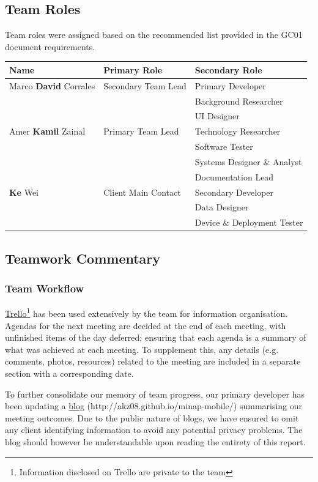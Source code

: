 \documentclass[12pt,a4paper,oneside,titlepage]{article}
\begin{document}
\subsection{Team Roles}
Team roles were assigned based on the recommended list provided in the GC01 document requirements.
\begin{center}
    \begin{tabular}{ | l | l | p{5.4cm} |}
    \hline
    Name & Primary Role & Secondary Role \\ \hline
    Marco \textbf{David} Corrales & Secondary Team Lead & Primary Developer \\&& Background Researcher \\&& UI Designer \\ \hline
     Amer \textbf{Kamil} Zainal & Primary Team Lead & Technology Researcher \\&& Software Tester \\&& Systems Designer \& Analyst \\&& Documentation Lead \\ \hline
     \textbf{Ke} Wei & Client Main Contact & Secondary Developer \\&& Data Designer \\&& Device \& Deployment Tester \\ \hline
    \end{tabular}
\end{center}

\subsection{Teamwork Commentary}
\subsubsection{Team Workflow}
\href{https://trello.com}{Trello}\footnote{Information disclosed on Trello are private to the team} has been used extensively by the team for information organisation. Agendas for the next meeting are decided at the end of each meeting, with unfinished items of the day deferred; ensuring that each agenda is a summary of what was achieved at each meeting. To supplement this, any details (e.g. comments, photos, resources) related to the meeting are included in a separate section with a corresponding date. 

To further consolidate our memory of team progress, our primary developer has been updating a \href{http://akz08.github.io/minap-mobile/}{blog} (http://akz08.github.io/minap-mobile/) summarising our meeting outcomes. Due to the public nature of blogs, we have ensured to omit any client identifying information to avoid any potential privacy problems. The blog should however be understandable upon reading the entirety of this report.
\end{document}
